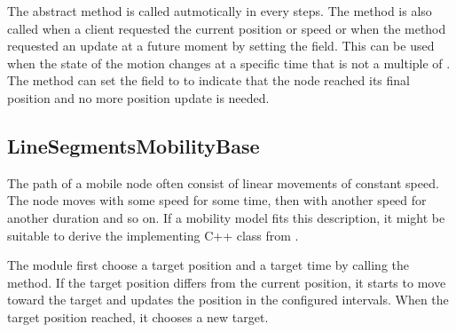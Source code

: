 The abstract  method is called autmotically in every
 steps. The method is also called when a client
requested the current position or speed or when the  method
requested an update at a future moment by setting the 
field. This can be used when the state of the motion changes at a
specific time that is not a multiple of .
The method can set the  field to  to
indicate that the node reached its final position and no more position
update is needed.


\subsection{LineSegmentsMobilityBase}

The path of a mobile node often consist of linear movements of constant
speed. The node moves with some speed for some time, then with another
speed for another duration and so on. If a mobility model fits this
description, it might be suitable to derive the implementing C++ class
from .

The module first choose a target position and a target time by calling
the  method. If the target position differs
from the current position, it starts to move toward the target and
updates the position in the configured  intervals.
When the target position reached, it chooses a new target.



\fi



